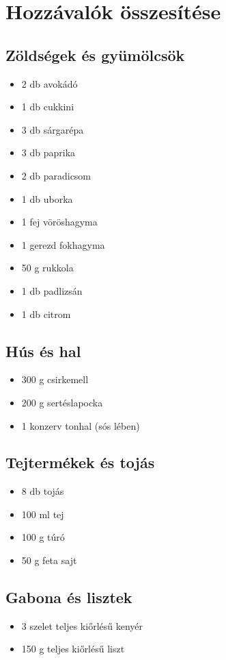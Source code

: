 \section{Hozzávalók összesítése}
\sordisz
\begin{multicols}{2}
\subsection{Zöldségek és gyümölcsök}
\begin{itemize}
    \item 2 db avokádó
    \item 1 db cukkini
    \item 3 db sárgarépa
    \item 3 db paprika
    \item 2 db paradicsom
    \item 1 db uborka
    \item 1 fej vöröshagyma
    \item 1 gerezd fokhagyma
    \item 50 g rukkola
    \item 1 db padlizsán
    \item 1 db citrom
\end{itemize}

\subsection{Hús és hal}
\begin{itemize}
    \item 300 g csirkemell
    \item 200 g sertéslapocka
    \item 1 konzerv tonhal (sós lében)
\end{itemize}

\subsection{Tejtermékek és tojás}
\begin{itemize}
    \item 8 db tojás
    \item 100 ml tej
    \item 100 g túró
    \item 50 g feta sajt
\end{itemize}

\subsection{Gabona és lisztek}
\begin{itemize}
    \item 3 szelet teljes kiőrlésű kenyér
    \item 150 g teljes kiőrlésű liszt
\end{itemize}


\end{multicols}
